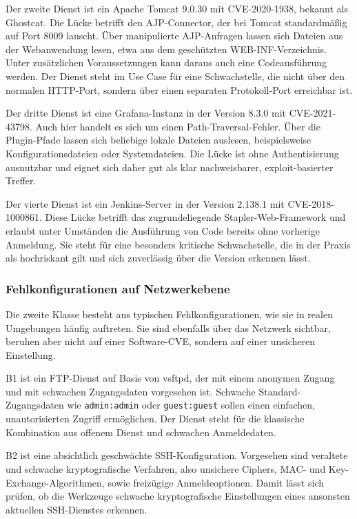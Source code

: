 Der zweite Dienst ist ein Apache Tomcat 9.0.30 mit CVE-2020-1938, bekannt als Ghostcat. Die Lücke
betrifft den AJP-Connector, der bei Tomcat standardmäßig auf Port 8009 lauscht. Über manipulierte
AJP-Anfragen lassen sich Dateien aus der Webanwendung lesen, etwa aus dem geschützten
WEB-INF-Verzeichnis. Unter zusätzlichen Voraussetzungen kann daraus auch eine Codeausführung werden.
Der Dienst steht im Use Case für eine Schwachstelle, die nicht über den normalen HTTP-Port, sondern
über einen separaten Protokoll-Port erreichbar ist.

Der dritte Dienst ist eine Grafana-Instanz in der Version 8.3.0 mit CVE-2021-43798. Auch hier handelt
es sich um einen Path-Traversal-Fehler. Über die Plugin-Pfade lassen sich beliebige lokale Dateien
auslesen, beispielsweise Konfigurationsdateien oder Systemdateien. Die Lücke ist ohne
Authentisierung ausnutzbar und eignet sich daher gut als klar nachweisbarer, exploit-basierter
Treffer.

Der vierte Dienst ist ein Jenkins-Server in der Version 2.138.1 mit CVE-2018-1000861. Diese Lücke
betrifft das zugrundeliegende Stapler-Web-Framework und erlaubt unter Umständen die Ausführung von
Code bereits ohne vorherige Anmeldung. Sie steht für eine besonders kritische Schwachstelle, die in
der Praxis als hochriskant gilt und sich zuverlässig über die Version erkennen lässt.

\subsubsection{Fehlkonfigurationen auf Netzwerkebene}

Die zweite Klasse besteht aus typischen Fehlkonfigurationen, wie sie in realen Umgebungen häufig
auftreten. Sie sind ebenfalls über das Netzwerk sichtbar, beruhen aber nicht auf einer
Software-CVE, sondern auf einer unsicheren Einstellung.

B1 ist ein FTP-Dienst auf Basis von vsftpd, der mit einem anonymen Zugang und mit schwachen
Zugangsdaten vorgesehen ist. Schwache Standard-Zugangsdaten wie \texttt{admin:admin} oder
\texttt{guest:guest} sollen einen einfachen, unautorisierten Zugriff ermöglichen. Der Dienst steht
für die klassische Kombination aus offenem Dienst und schwachen Anmeldedaten.

B2 ist eine absichtlich geschwächte SSH-Konfiguration. Vorgesehen sind veraltete und schwache
kryptografische Verfahren, also unsichere Ciphers, MAC- und Key-Exchange-Algorithmen, sowie
freizügige Anmeldeoptionen. Damit lässt sich prüfen, ob die Werkzeuge schwache kryptografische
Einstellungen eines ansonsten aktuellen SSH-Dienstes erkennen.

